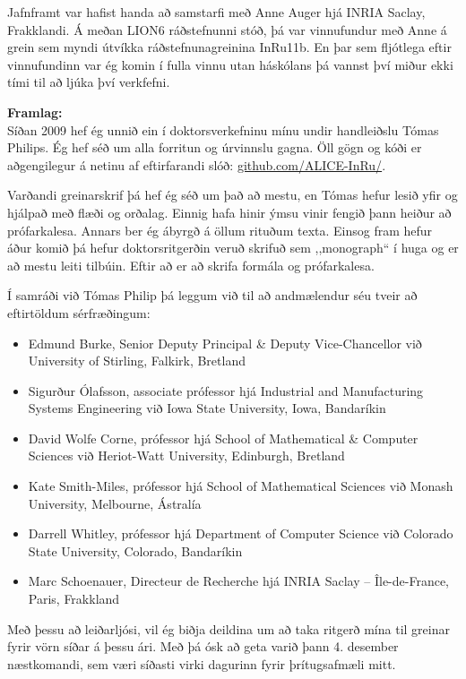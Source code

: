 \documentclass{cover}
\newcommand{\mycaption}[1]{{\bfseries #1:}\\}
\begin{document}
{Jafnframt var hafist handa að samstarfi með Anne Auger hjá INRIA Saclay, 
Frakklandi. 
Á meðan LION6 ráðstefnunni stóð, þá var vinnufundur með Anne á grein sem myndi 
útvíkka ráðstefnunagreinina InRu11b. 
En þar sem fljótlega eftir vinnufundinn var ég komin í fulla vinnu utan 
háskólans þá vannst því miður ekki tími til að ljúka því verkfefni.

\mycaption{Framlag}
Síðan 2009 hef ég unnið ein í doktorsverkefninu mínu undir handleiðslu Tómas 
Philips. 
Ég hef séð um alla forritun og úrvinnslu gagna. Öll gögn og kóði er 
aðgengilegur á netinu af eftirfarandi slóð: \url{github.com/ALICE-InRu/}.

Varðandi greinarskrif þá hef ég séð um það að mestu, en Tómas hefur lesið yfir 
og hjálpað með flæði og orðalag. Einnig hafa hinir ýmsu vinir fengið þann 
heiður að prófarkalesa. Annars ber ég ábyrgð á öllum rituðum texta.
Einsog fram hefur áður komið þá hefur doktorsritgerðin veruð skrifuð sem 
,,monograph`` í huga og er að mestu leiti tilbúin. 
Eftir að er að skrifa formála og prófarkalesa. 

\clearpage
Í samráði við Tómas Philip þá leggum við til að andmælendur séu tveir að 
eftirtöldum sérfræðingum:

\begin{itemize} 
    \item Edmund Burke, Senior Deputy Principal \& Deputy Vice-Chancellor við  
    University of Stirling, Falkirk, Bretland
    \item Sigurður Ólafsson, associate prófessor hjá Industrial and 
    Manufacturing Systems Engineering við Iowa State University, Iowa, 
    Bandaríkin
    \item David Wolfe Corne, prófessor hjá School of Mathematical \& Computer 
    Sciences við Heriot-Watt University, Edinburgh, Bretland
    \item Kate Smith-Miles, prófessor hjá School of Mathematical Sciences við 
    Monash University, Melbourne, Ástralía
    \item Darrell Whitley, prófessor hjá Department of Computer Science við  
    Colorado State University, Colorado, Bandaríkin
    \item Marc Schoenauer, Directeur de Recherche hjá INRIA Saclay -- 
    Île-de-France, Paris, Frakkland
\end{itemize}

Með þessu að leiðarljósi, vil ég biðja deildina um að taka ritgerð mína til 
greinar fyrir vörn síðar á þessu ári. Með þá ósk að geta varið þann 4. desember 
næstkomandi, sem væri síðasti virki dagurinn fyrir þrítugsafmæli mitt. 

}{}{}
\end{document}
